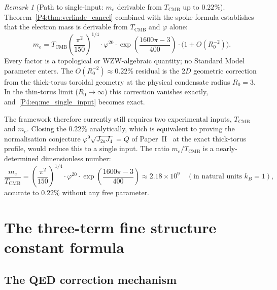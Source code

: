 \documentclass[11pt,a4paper]{article}
\theoremstyle{definition}
\theoremstyle{remark}
\newtheorem{remark}[theorem]{Remark}
\newcommand{\vp}{\varphi}
\newcommand{\Ja}{J_{2a}}
\newcommand{\Jfour}{J_{4}}
\newcommand{\TCMB}{T_{\mathrm{CMB}}}
\begin{document}
\begin{remark}[Path to single-input: $m_e$ derivable from $\TCMB$ up to $0.22\%$]
\label{P4:rem:single_input}
Theorem~\ref{P4:thm:verlinde_cancel} combined with the spoke formula
establishes that the electron mass is derivable from $\TCMB$ and
$\vp$ alone:
\begin{equation}
  m_e
  = \TCMB\!\left(\frac{\pi^2}{150}\right)^{\!\!1/4}
    \cdot\vp^{20}\cdot
    \exp\!\left(\frac{1600\pi - 3}{400}\right)
    \cdot\bigl(1 + O(R_0^{-2})\bigr).
  \label{P4:eq:me_single_input}
\end{equation}
Every factor is a topological or WZW-algebraic quantity; no Standard
Model parameter enters.
The $O(R_0^{-2})\approx0.22\%$ residual is the $2D$ geometric correction from
the thick-torus toroidal geometry at the physical condensate radius $R_0=3$.
In the thin-torus limit ($R_0\to\infty$) this correction vanishes exactly,
and~\eqref{P4:eq:me_single_input} becomes exact.

The framework therefore currently still requires two experimental inputs,
$\TCMB$ and $m_e$.  Closing the $0.22\%$ analytically, which is
equivalent to proving the normalisation conjecture
$\vp^9\sqrt{\Ja\Jfour}=Q$ of Paper~II~\cite{Paper2} at the exact
thick-torus profile, would reduce this to a single input.
The ratio $m_e/\TCMB$ is a nearly-determined dimensionless number:
\begin{equation}
  \frac{m_e}{\TCMB}
  = \left(\frac{\pi^2}{150}\right)^{\!\!1/4}
    \cdot\vp^{20}\cdot
    \exp\!\left(\frac{1600\pi-3}{400}\right)
  \approx 2.18\times10^9
  \quad(\text{in natural units }k_B=1),
  \label{P4:eq:me_TCMB_ratio}
\end{equation}
accurate to $0.22\%$ without any free parameter.
\end{remark}

\section{The three-term fine structure constant formula}
\label{P4:sec:three_term}

\subsection{The QED correction mechanism}
\end{document}
